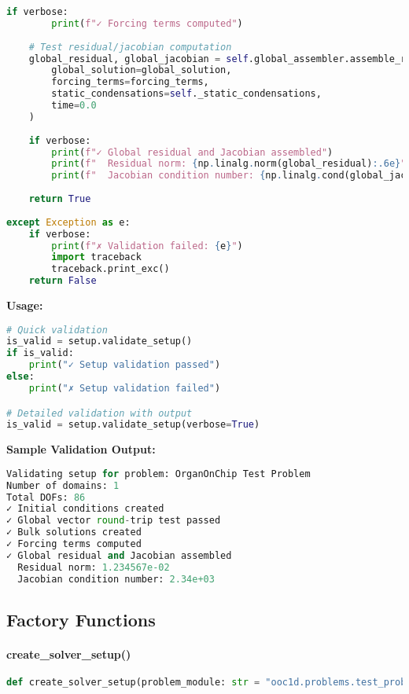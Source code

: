 \begin{lstlisting}[language=Python, caption=Validate Setup Algorithm]
    if verbose:
        print(f"✓ Forcing terms computed")
    
    # Test residual/jacobian computation
    global_residual, global_jacobian = self.global_assembler.assemble_residual_and_jacobian(
        global_solution=global_solution,
        forcing_terms=forcing_terms,
        static_condensations=self._static_condensations,
        time=0.0
    )
    
    if verbose:
        print(f"✓ Global residual and Jacobian assembled")
        print(f"  Residual norm: {np.linalg.norm(global_residual):.6e}")
        print(f"  Jacobian condition number: {np.linalg.cond(global_jacobian):.2e}")
    
    return True
    
except Exception as e:
    if verbose:
        print(f"✗ Validation failed: {e}")
        import traceback
        traceback.print_exc()
    return False
\end{lstlisting}

\textbf{Usage:}
\begin{lstlisting}[language=Python, caption=Validation Usage]
# Quick validation
is_valid = setup.validate_setup()
if is_valid:
    print("✓ Setup validation passed")
else:
    print("✗ Setup validation failed")

# Detailed validation with output
is_valid = setup.validate_setup(verbose=True)
\end{lstlisting}

\textbf{Sample Validation Output:}
\begin{lstlisting}[language=Python, caption=Sample Validation Output]
Validating setup for problem: OrganOnChip Test Problem
Number of domains: 1
Total DOFs: 86
✓ Initial conditions created
✓ Global vector round-trip test passed
✓ Bulk solutions created
✓ Forcing terms computed
✓ Global residual and Jacobian assembled
  Residual norm: 1.234567e-02
  Jacobian condition number: 2.34e+03
\end{lstlisting}

\subsection{Factory Functions}
\label{subsec:factory_functions_detailed}

\paragraph{create\_solver\_setup()}
\begin{lstlisting}[language=Python, caption=Create Solver Setup Function]
def create_solver_setup(problem_module: str = "ooc1d.problems.test_problem2") -> SolverSetup
\end{lstlisting}

